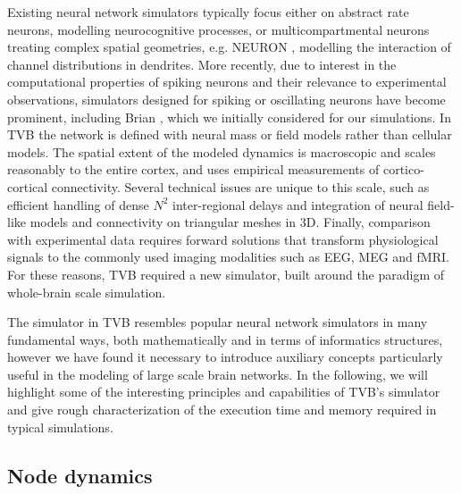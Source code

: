 \documentclass{bioinfo}
\begin{document}
Existing neural network simulators typically focus either on abstract rate neurons, 
modelling neurocognitive processes, or 
multicompartmental neurons treating complex spatial
geometries, e.g. NEURON \citep{Hines_2001}, modelling the interaction of 
channel distributions in dendrites.  More recently, due to interest in
the computational properties of spiking neurons and their relevance to
experimental observations, simulators designed for spiking or oscillating neurons
have become prominent, including Brian \citep{Goodman_2009}, which we initially 
considered for our simulations.
In TVB the network is defined with neural mass or field
models \citep{Deco_2008a, Coombes_2010} rather than cellular models. The
spatial extent of the modeled dynamics is macroscopic and scales reasonably 
to the entire cortex, and uses empirical measurements of cortico-cortical
connectivity. Several technical issues are unique to this scale, such
as efficient handling of dense $N^2$ inter-regional delays and integration
of neural field-like models and connectivity on triangular meshes in 3D.
Finally, comparison with experimental data requires forward solutions
that transform physiological signals to the commonly
used imaging modalities such as EEG, MEG and fMRI.
For these reasons, TVB required a new simulator, built around the paradigm
of whole-brain scale simulation.

The simulator in TVB resembles popular neural network simulators in 
many fundamental ways, both mathematically and in terms of informatics 
structures, however we have found it necessary to introduce auxiliary
concepts particularly useful in the modeling of large scale brain 
networks. In the following, we will highlight some of the interesting
principles and capabilities of TVB's simulator and give rough characterization
of the execution time and memory required in typical simulations.

\subsection{Node dynamics}
\end{document}
